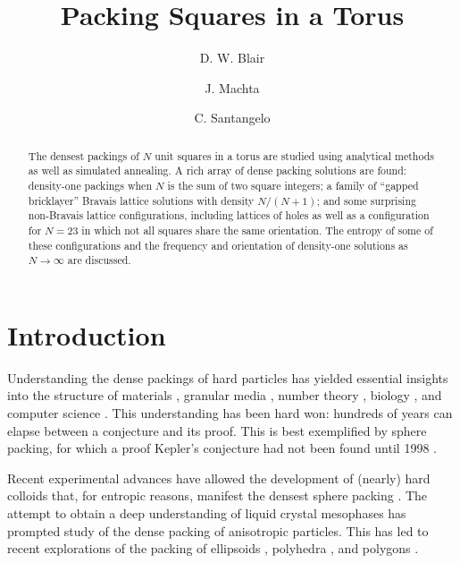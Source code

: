 \documentclass[aps]{revtex4}
\begin{document}
\title{Packing Squares in a Torus}

\author{D. W. Blair}

\author{J. Machta}

\author{C. Santangelo}

\begin{abstract}
The densest packings of $N$ unit squares in a torus are studied using analytical methods as well as simulated annealing.  A rich array of dense packing solutions are found: density-one packings when $N$ is the sum of two square integers; a family of ``gapped bricklayer'' Bravais lattice solutions with density $N/(N+1)$; and some surprising non-Bravais lattice configurations, including lattices of holes as well as a configuration for $N=23$ in which not all squares share the same orientation.  The entropy of some of these configurations and the frequency and orientation of density-one solutions as $N \rightarrow \infty$ are discussed.

\end{abstract} 
\maketitle


\section{Introduction}

Understanding the dense packings of hard particles has yielded essential insights into the structure of materials \cite{Bernal1964,Zallen1983,Torquato2002,Chaikin2000}, granular media \cite{Torquato2002,Mehta1994}, number theory \cite{COHNa,Conway1999}, biology 
\cite{Gevertz2008,Purohit2003}, and computer science \cite{Johnson1974,Lodi2002}. This understanding has been hard won: hundreds of years can elapse between a conjecture and its proof. This is best exemplified by sphere packing, for which a proof Kepler's conjecture had not been found until 1998 \cite{HALESa}.

Recent experimental advances have allowed the development of (nearly) hard colloids that, for entropic reasons, manifest the densest sphere packing \cite{Pusey1986}. The attempt to obtain a deep understanding of liquid crystal mesophases has prompted study of the dense packing of anisotropic particles. This has led to recent explorations of the packing of ellipsoids \cite{Donev2004,Ras2011}, polyhedra \cite{ROAN,BAKER}, and polygons \cite{STROOBANTS}.
\end{document}
